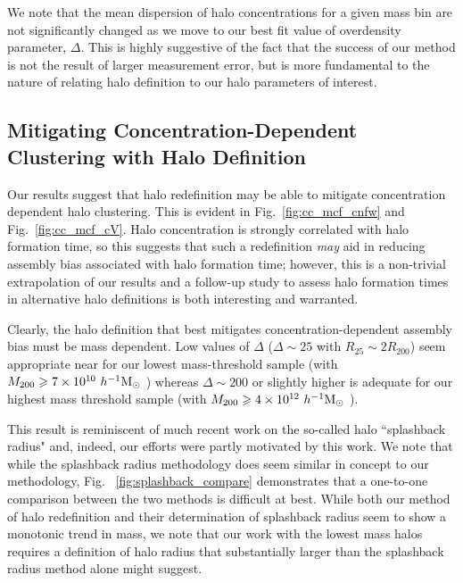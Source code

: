 \documentclass[usenatbib,fleqn]{mnras}
\begin{document}
We note that the mean dispersion of halo concentrations for a given mass
bin are not significantly changed as we move to our best fit value of
overdensity parameter, $\Delta$. This is highly suggestive of the fact
that the success of our method is not the result of larger measurement
error, but is more fundamental to the nature of relating halo definition to
our halo parameters of interest.


\subsection{Mitigating Concentration-Dependent Clustering with Halo Definition}

Our results suggest that halo redefinition may be able to mitigate concentration dependent halo clustering. This is evident in Fig.~\ref{fig:cc_mcf_cnfw} and Fig.~\ref{fig:cc_mcf_cV}. Halo concentration is strongly correlated with halo formation time, so this suggests that such a redefinition {\em may} aid in reducing assembly bias associated with halo formation time; however, this is a non-trivial extrapolation of our results and a follow-up study to assess halo formation times in alternative halo definitions is both interesting and warranted. 

Clearly, the halo definition that best mitigates concentration-dependent assembly bias must be mass dependent. Low values of $\Delta$ ($\Delta \sim 25$ with $R_{25} \sim 2R_{200}$) seem appropriate near for our lowest mass-threshold sample (with $M_{200} \geqslant 7 \times 10^{10} \ h^{-1}\mathrm{M}_{\odot}~$) whereas $\Delta \sim 200$ or slightly higher is adequate for our highest mass threshold sample (with $M_{200} \geqslant 4 \times 10^{12} \ h^{-1}\mathrm{M}_{\odot}~$). 

This result is reminiscent of much recent work on the so-called halo ``splashback radius" \citep{more_etal15} and, indeed, our efforts were partly motivated by this work. We note that while the splashback radius methodology does seem similar in concept to our methodology, Fig. ~\ref{fig:splashback_compare} demonstrates that a one-to-one comparison between the two methods is difficult
at best. While both our method of halo redefinition and their determination of splashback radius seem to show a
monotonic trend in mass, we note that our work with the lowest mass halos requires a definition of halo radius
that substantially larger than the splashback radius method alone might suggest.
\end{document}
